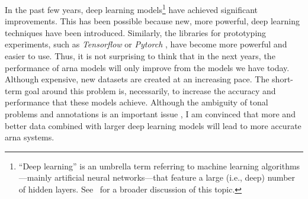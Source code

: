 

In the past few years, deep learning models\footnote{``Deep
learning'' is an umbrella term referring to machine learning
algorithms---mainly artificial neural networks---that
feature a large (i.e., deep) number of hidden layers.
See~ for a broader discussion of
this topic.} have achieved significant improvements. This
has been possible because new, more powerful, deep learning
techniques have been introduced. Similarly, the libraries
for prototyping experiments, such as \emph{Tensorflow}
\parencite{abadi2016tensorflow} or \emph{Pytorch}
\parencite{paszke2019pytorch}, have become more powerful and
easier to use. Thus, it is not surprising to think that in
the next years, the performance of \gls{arna} models will
only improve from the models we have today. Although
expensive, new datasets are created at an increasing pace.
The short-term goal around this problem is, necessarily, to
increase the accuracy and performance that these models
achieve. Although the ambiguity of tonal problems and
annotations is an important issue
\parencite{ju2021addressing}, I am convinced that more and
better data combined with larger deep learning models will
lead to more accurate \gls{arna} systems.
